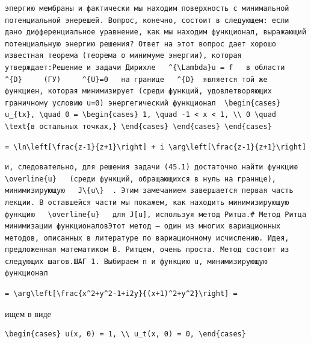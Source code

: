 \documentclass[
  ukrainian,
]{article}
\begin{document}
\begin{verbatim}
эпергию мембраны и фактически мы находим поверхность с минимальной потенциальной энерешей. Вопрос, конечно, состоит в следующем: если дано дифференциальное уравнение, как мы находим функционал, выражающий потенциальную энергию решения? Ответ на этот вопрос дает хорошо известная теорема (теорема о минимуме энергии), которая утверждает:Решение и задачи Дирихле   ^{\Lambda}u = f   в области   ^{D}     (ГУ)     ^{U}=0   на границе   ^{D}  является той же функциен, которая минимизирует (среди функций, удовлетворяющих граничному условию u=0) энергегический функционал  \begin{cases} u_{tx}, \quad 0 = \begin{cases} 1, \quad -1 < x < 1, \\ 0 \quad \text{в остальных точках,} \end{cases} \end{cases} \end{cases}
\end{verbatim}

\begin{verbatim}
= \ln\left[\frac{z-1}{z+1}\right] + i \arg\left[\frac{z-1}{z+1}\right]
\end{verbatim}

\begin{verbatim}
и, следовательно, для решения задачи (45.1) достаточно найти функцию   \overline{u}   (среди функций, обращающихся в нуль на граннце), минимизирующую   J\{u\}  . Этим замечанием завершается первая часть лекции. В оставшейся части мы покажем, как находить минимизирующую функцию   \overline{u}   для J[u], используя метод Ритца.# Метод Ритца минимизации функционаловЭтот метод — один из многих вариационных методов, описанных в литературе по вариационному исчислению. Идея, предложенная математиком В. Ритцем, очень проста. Метод состоит из следующих шагов.ШАГ 1. Выбираем n и функцию u, минимизирующую функционал
\end{verbatim}

\begin{verbatim}
= \arg\left[\frac{x^2+y^2-1+i2y}{(x+1)^2+y^2}\right] =
\end{verbatim}

ищем в виде

\begin{verbatim}
\begin{cases} u(x, 0) = 1, \\ u_t(x, 0) = 0, \end{cases}
\end{verbatim}
\end{document}
